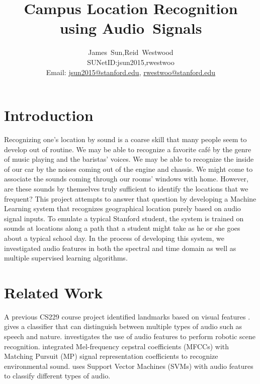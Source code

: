 \documentclass[journal]{IEEEtran}
\begin{document}
\title{Campus Location Recognition using {Audio~Signals}}

\author{James~Sun,Reid~Westwood
        \\
        SUNetID:{jsun2015,rwestwoo}\\
        Email: \href{mailto:}{jsun2015@stanford.edu},  \href{mailto:}{rwestwoo@stanford.edu} }


\maketitle




\section{Introduction} \label{Intro}
Recognizing one's location by sound is a coarse skill that many people seem to develop out of routine. We may be able to recognize a favorite caf\'e by the genre of music playing and the baristas' voices. We may be able to recognize the inside of our car by the noises coming out of the engine and chassis. We might come to associate the sounds coming through our rooms' windows with home. However, are these sounds by themselves truly sufficient to identify the locations that we frequent?
This project attempts to answer that question by developing a Machine Learning system that recognizes geographical location purely based on audio signal inputs. To emulate a typical Stanford student, the system is trained on sounds at locations along a path that a student might take as he or she goes about a typical school day. In the process of developing this system, we investigated audio features in both the spectral and time domain as well as multiple supervised learning algorithms.

\section{Related Work} \label{Related}
A previous CS229 course project identified landmarks based on visual features \cite{Crudge:article_typical}. \cite{Chen} gives a classifier that can distinguish between multiple types of audio such as speech and nature. \cite{Chu} investigates the use of audio features to perform robotic scene recognition. \cite{Chu2Env} integrated Mel-frequency cepstral coefficients (MFCCs) with Matching Pursuit (MP) signal representation coefficients to recognize environmental sound. \cite{guo2003content} uses Support Vector Machines (SVMs) with audio features to classify different types of audio.
\end{document}
